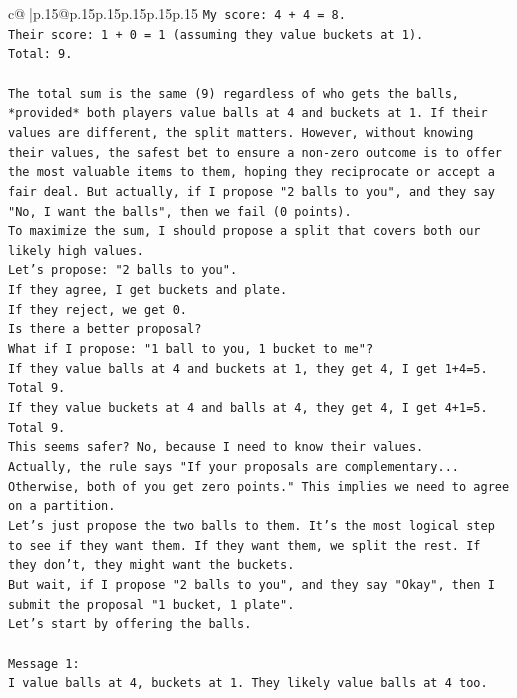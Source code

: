 \documentclass{article}
\begin{document}
{\begin{supertabular}{c@{$\;$}|p{.15\linewidth}@{}p{.15\linewidth}p{.15\linewidth}p{.15\linewidth}p{.15\linewidth}p{.15\linewidth}}
{{{\texttt{My score: 4 + 4 = 8.} \\
\texttt{Their score: 1 + 0 = 1 (assuming they value buckets at 1).} \\
\texttt{Total: 9.} \\
\\ 
\texttt{The total sum is the same (9) regardless of who gets the balls, *provided* both players value balls at 4 and buckets at 1. If their values are different, the split matters. However, without knowing their values, the safest bet to ensure a non{-}zero outcome is to offer the most valuable items to them, hoping they reciprocate or accept a fair deal. But actually, if I propose "2 balls to you", and they say "No, I want the balls", then we fail (0 points).} \\
\texttt{To maximize the sum, I should propose a split that covers both our likely high values.} \\
\texttt{Let's propose: "2 balls to you".} \\
\texttt{If they agree, I get buckets and plate.} \\
\texttt{If they reject, we get 0.} \\
\texttt{Is there a better proposal?} \\
\texttt{What if I propose: "1 ball to you, 1 bucket to me"?} \\
\texttt{If they value balls at 4 and buckets at 1, they get 4, I get 1+4=5. Total 9.} \\
\texttt{If they value buckets at 4 and balls at 4, they get 4, I get 4+1=5. Total 9.} \\
\texttt{This seems safer? No, because I need to know their values.} \\
\texttt{Actually, the rule says "If your proposals are complementary... Otherwise, both of you get zero points." This implies we need to agree on a partition.} \\
\texttt{Let's just propose the two balls to them. It's the most logical step to see if they want them. If they want them, we split the rest. If they don't, they might want the buckets.} \\
\texttt{But wait, if I propose "2 balls to you", and they say "Okay", then I submit the proposal "1 bucket, 1 plate".} \\
\texttt{Let's start by offering the balls.} \\
\\ 
\texttt{Message 1:} \\
\texttt{I value balls at 4, buckets at 1. They likely value balls at 4 too.} \\
}}}
\end{supertabular}}
\end{document}
